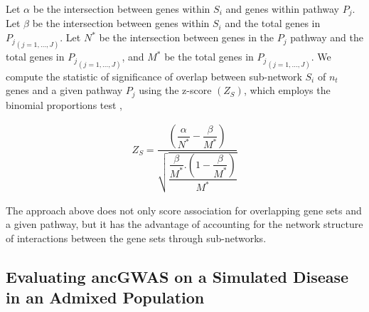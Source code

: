 \documentclass[10pt]{article}
\begin{document}
Let $\alpha$ be the intersection between genes within $S_{i}$ and genes within pathway $P_{j}$. Let $\beta$ be the intersection between genes within $S_{i}$ and the total genes in ${P_{j}}_{(j=1,\ldots,J)}$. Let $N^{*}$ be the intersection between genes in the $P_{j}$ pathway and the total genes in ${P_{j}}_{(j=1,\ldots,J)}$, and $M^{*}$ be the total genes in ${P_{j}}_{(j=1,\ldots,J)}$. We compute the statistic of significance of overlap between sub-network $S_{i}$ of $n_{t}$ genes and a given pathway $P_{j}$ using the z-score $(Z_{S})$, which employs the binomial proportions test \cite{berge},

\setlength\arraycolsep{2pt}
\begin{eqnarray}
Z_{S} = \dfrac{\left(\dfrac{\alpha}{N^{*}}-\dfrac{\beta}{M^{*}} \right)}{\sqrt{ \dfrac{\dfrac{\beta}{M^{*}}.\left(1-\dfrac{\beta}{M^{*}}\right)}{M^{*}}}}
\end{eqnarray}

The approach above does not only score association for overlapping gene sets and a given pathway, but it has the advantage of accounting for the network structure of interactions between the gene sets through sub-networks.

 \subsection*{Evaluating ancGWAS on a Simulated Disease in an Admixed Population}
\label{ancSIM}
\end{document}

